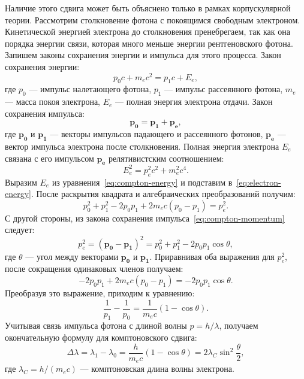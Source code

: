\documentclass[a4paper, 12pt]{article}
\begin{document}
Наличие этого сдвига может быть объяснено только в рамках корпускулярной теории.
Рассмотрим столкновение фотона с покоящимся свободным электроном. Кинетической
энергией электрона до столкновения пренебрегаем, так как она порядка энергии
связи, которая много меньше энергии рентгеновского фотона. Запишем законы
сохранения энергии и импульса для этого процесса. Закон сохранения энергии:
\begin{equation}
\label{eq:compton-energy}
p_0 c + m_e c^2 = p_1 c + E_e,
\end{equation}
где $p_0$ --- импульс налетающего фотона, $p_1$ --- импульс рассеянного фотона,
$m_e$ --- масса покоя электрона, $E_e$ --- полная энергия электрона отдачи. Закон
сохранения импульса:
\begin{equation}
\label{eq:compton-momentum}
\bm{p_0} = \bm{p_1} + \bm{p_e},
\end{equation}
где $\bm{p_0}$ и $\bm{p_1}$ --- векторы импульсов падающего и рассеянного фотонов,
$\bm{p_e}$ --- вектор импульса электрона после столкновения. Полная энергия
электрона $E_e$ связана с его импульсом $\bm{p_e}$ релятивистским соотношением:
\begin{equation}
\label{eq:electron-energy}
E_e^2 = p_e^2 c^2 + m^2_e c^4.
\end{equation}
Выразим $E_e$ из уравнения~\eqref{eq:compton-energy} и подставим
в~\eqref{eq:electron-energy}. После раскрытия квадрата и алгебраических
преобразований получим:
\begin{equation}
p_0^2 + p_1^2 - 2 p_0 p_1 + 2 m_e c (p_0 - p_1) = p_e^2.
\end{equation}
С другой стороны, из закона сохранения импульса~\eqref{eq:compton-momentum} следует:
\begin{equation}
p_e^2 = (\bm{p_0} - \bm{p_1})^2 = p_0^2 + p_1^2 - 2 p_0 p_1 \cos\theta,
\end{equation}
где $\theta$ --- угол между векторами $\bm{p_0}$ и $\bm{p_1}$.
Приравнивая оба выражения для $p_e^2$, после сокращения одинаковых членов получаем:
\begin{equation}
- 2 p_0 p_1 + 2 m_e c (p_0 - p_1) = - 2 p_0 p_1 \cos\theta.
\end{equation}
Преобразуя это выражение, приходим к уравнению:
\begin{equation}
\frac{1}{p_1} - \frac{1}{p_0} = \frac{1}{m_e c} (1 - \cos\theta).
\end{equation}
Учитывая связь импульса фотона с длиной волны $p = h/\lambda$, получаем окончательную
формулу для комптоновского сдвига:
\begin{equation}
  \label{eq:compton-shift}
  \Delta\lambda = \lambda_1 - \lambda_0 = \frac{h}{m_e c} (1 - \cos\theta) = 2\lambda_C \sin^2\frac{\theta}{2},
\end{equation}
где $\lambda_C = h/(m_e c)$ --- комптоновская длина волны электрона.
\end{document}
